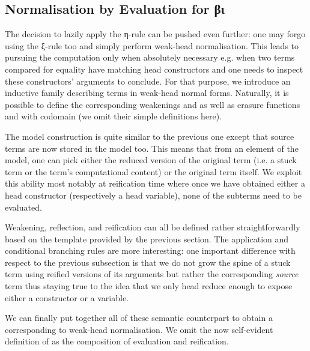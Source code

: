 \subsection{Normalisation by Evaluation for βι}

The decision to lazily apply the η-rule can be pushed even further: one may
forgo using the ξ-rule too and simply perform weak-head normalisation. This
leads to pursuing the computation only when absolutely necessary e.g.
when two terms compared for equality have matching head constructors
and one needs to inspect these constructors' arguments to conclude. For
that purpose, we introduce an inductive family describing terms in weak-head
normal forms. Naturally, it is possible to define the corresponding weakenings
 and  as well as erasure functions 
and  with codomain  (we omit their simple definitions here).


The model construction is quite similar to the previous one except
that source terms are now stored in the model too. This means that
from an element of the model, one can pick either the reduced version
of the original term (i.e. a stuck term or the term's computational
content) or the original term itself. We exploit this ability most
notably at reification time where once we have obtained either a
head constructor (respectively a head variable), none of the subterms
need to be evaluated.



Weakening, reflection, and reification can all be defined rather
straightforwardly based on the template provided by the previous
section. The application and conditional branching rules are more
interesting: one important difference with respect to the previous
subsection is that we do not grow the spine of a stuck term using
reified versions of its arguments but rather the corresponding
\emph{source} term thus staying true to the idea that we only head
reduce enough to expose either a constructor or a variable.

We can finally put together all of these semantic counterpart to
obtain a  corresponding to weak-head normalisation.
We omit the now self-evident definition of  as the
composition of evaluation and reification.

